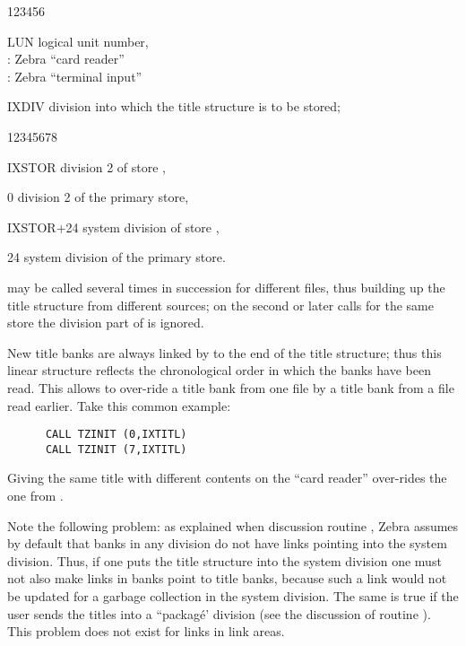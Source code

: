 \begin{DLtt}{123456}
\item[LUN] logical unit number,\\
           :  Zebra ``card reader'' \\
           :  Zebra ``terminal input'' 
\item[IXDIV] division into which the title structure is to be stored;
         \begin{DLtt}{12345678}
            \item[IXSTOR]    division 2 of store ,
            \item[0]         division 2 of the primary store,
            \item[IXSTOR+24] system division of store ,
            \item[24]        system division of the primary store.
         \end{DLtt}
\end{DLtt}

 may be called several times in succession for different files,
thus building up the title structure from different sources;
on the second or later calls for the same store the division
part of  is ignored.

New title banks are always linked by  to the end
of the title structure;
thus this linear structure reflects the chronological order
in which the banks have been read.
This allows to over-ride a title bank from one file
by a title bank from a file read earlier.
Take this common example:
\begin{verbatim}
      CALL TZINIT (0,IXTITL)
      CALL TZINIT (7,IXTITL)
\end{verbatim} 
Giving the same title with different contents on the ``card reader''
over-rides the one from .

Note the following problem:
as explained when discussion routine ,
Zebra assumes by default that banks in any division do not have
links pointing into the system division.
Thus, if one puts the title structure into the system division
one must not also make links in banks point to title banks,
because such a link would not be updated for a garbage collection
in the system division.
The same is true if the user sends the titles into
a ``packag\'e' division (see the discussion of routine ).
This problem does not exist for links in link areas.

